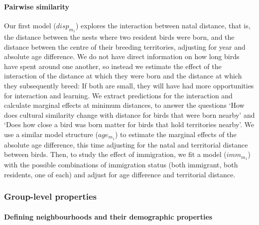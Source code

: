 \paragraph{Pairwise similarity}
Our first model ($disp_{m_1}$) explores the interaction between natal distance, that is, the distance between the nests where two resident birds were born, and the distance between the centre of their breeding territories, adjusting for year and absolute age difference. We do not have direct information on how long birds have spent around one another, so instead we estimate the effect of the interaction of the distance at which they were born and the distance at which they subsequently breed: If both are small, they will have had more opportunities for interaction and learning. We extract predictions for the interaction and calculate marginal effects at minimum distances, to answer the questions ‘How does cultural similarity change with distance for birds that were born nearby' and ‘Does how close a bird was born matter for birds that hold territories nearby'. We use a similar model structure ($age_{m_1}$) to estimate the marginal effects of the absolute age difference, this time adjusting for the natal and territorial distance between birds. Then, to study the effect of immigration, we fit a model ($imm_{m_1}$) with the possible combinations of immigration status (both immigrant, both residents, one of each) and adjust for age difference and territorial distance. 


\subsubsection{Group-level properties}

\paragraph{Defining neighbourhoods and their demographic properties}

